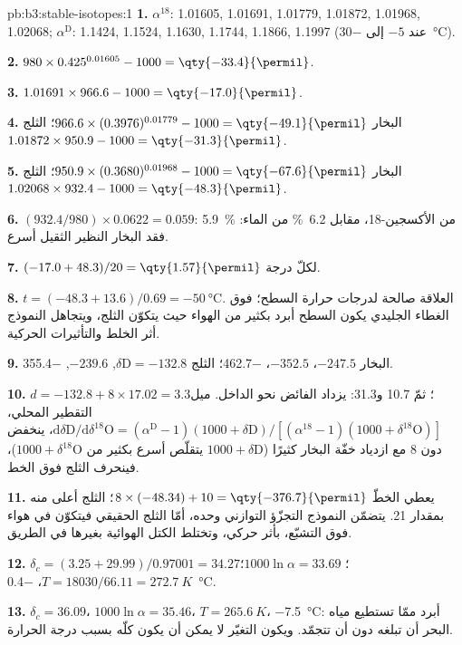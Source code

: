 \begin{solution}{pb:b3:stable-isotopes:1}
\textbf{1.} $\alpha^{18}$: 1.01605, 1.01691, 1.01779, 1.01872, 1.01968,
1.02068; $\alpha^{\mathrm D}$: 1.1424, 1.1524, 1.1630, 1.1744, 1.1866, 1.1997
(عند $-5$ إلى \qty{-30}{\celsius}).

\textbf{2.} $980\times0.425^{0.01605} - 1000 = \qty{-33.4}{\permil}$.

\textbf{3.} $1.01691\times966.6 - 1000 = \qty{-17.0}{\permil}$.

\textbf{4.} البخار $966.6\times(0.3976)^{0.01779} - 1000 = \qty{-49.1}{\permil}$؛
الثلج $1.01872\times950.9 - 1000 = \qty{-31.3}{\permil}$.

\textbf{5.} البخار $950.9\times(0.3680)^{0.01968} - 1000 = \qty{-67.6}{\permil}$؛
الثلج $1.02068\times932.4 - 1000 = \qty{-48.3}{\permil}$.

\textbf{6.} $(932.4/980)\times0.0622 = 0.059$: \qty{5.9}{\percent} من الأكسجين-18،
مقابل \qty{6.2}{\percent} من الماء: فقد البخار
النظير الثقيل أسرع.

\textbf{7.} $(-17.0 + 48.3)/20 = \qty{1.57}{\permil}$ لكلّ درجة.

\textbf{8.} $t = (-48.3 + 13.6)/0.69 = \qty{-50}{\celsius}$. العلاقة صالحة
لدرجات حرارة السطح؛ فوق الغطاء الجليدي يكون السطح أبرد بكثير من
الهواء حيث يتكوّن الثلج، ويتجاهل النموذج أثر الخلط والتأثيرات الحركية.

\textbf{9.} البخار $-247.5$، $-352.5$، \qty{-462.7}{\permil}؛ الثلج $\delta\mathrm D
= -132.8$, $-239.6$, \qty{-355.4}{\permil}.

\textbf{10.} $d = -132.8 + 8\times17.02 = 3.3$؛ ثمّ 10.7
و\qty{31.3}{\permil}: يزداد الفائض نحو الداخل. ميل
التقطير المحلي، $\mathrm d\delta\mathrm D/\mathrm d\delta^{18}\mathrm O = (\alpha^{\mathrm D} -
1)(1000 + \delta\mathrm D)/[(\alpha^{18} - 1)(1000 + \delta^{18}\mathrm O)]$، ينخفض دون
8 مع ازدياد خفّة البخار كثيرًا ($1000 + \delta\mathrm D$ يتقلّص أسرع بكثير من
$1000 + \delta^{18}\mathrm O$)، فينحرف الثلج فوق الخط.

\textbf{11.} يعطي الخطّ $8\times(-48.34) + 10 = \qty{-376.7}{\permil}$؛
الثلج أعلى منه بمقدار \qty{21}{\permil}. يتضمّن النموذج التجزّؤ التوازني وحده،
أمّا الثلج الحقيقي فيتكوّن في هواء فوق التشبّع، بأثر حركي،
وتختلط الكتل الهوائية بغيرها في الطريق.

\textbf{12.} $\delta_c = (3.25 + 29.99)/0.97001 = 34.27$؛ $1000\ln\alpha =
33.69$؛ $T = 18030/66.11 = \qty{272.7}{K}$، \qty{-0.4}{\celsius}.

\textbf{13.} $\delta_c = 36.09$، $1000\ln\alpha = 35.46$، $T = \qty{265.6}{K}$،
\qty{-7.5}{\celsius}: أبرد ممّا تستطيع مياه البحر أن تبلغه دون أن تتجمّد. ويكون
التغيّر لا يمكن أن يكون كلّه بسبب درجة الحرارة.


\end{solution}
